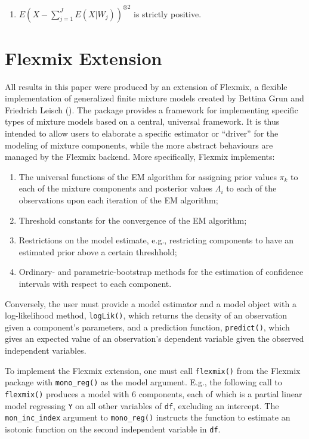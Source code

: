 \documentclass[10pt]{olplainarticle}\usepackage[]{graphicx}\usepackage[]{color}
\begin{document}
\begin{appendices}
\begin{enumerate}
  \item $E(X - \sum_{j=1}^{J}E(X|W_j))^{\otimes 2}$ is strictly positive.
\end{enumerate}

\section{Flexmix Extension}


All results in this paper were produced by an extension of Flexmix, a flexible implementation of generalized finite mixture models created by Bettina Grun and Friedrich Leisch (\cite{flexmix}). The package provides a framework for implementing specific types of mixture models based on a central, universal framework. It is thus intended to allow users to elaborate a specific estimator or ``driver'' for the modeling of mixture components, while the more abstract behaviours are managed by the Flexmix backend. More specifically, Flexmix implements:

\begin{enumerate}
  \item The universal functions of the EM algorithm for assigning prior values $\pi_k$ to each of the mixture components and posterior values $\Lambda_i$ to each of the observations upon each iteration of the EM algorithm;
  \item Threshold constants for the convergence of the EM algorithm;
  \item Restrictions on the model estimate, e.g., restricting components to have an estimated prior above a certain threshhold;
  \item Ordinary- and parametric-bootstrap methods for the estimation of confidence intervals with respect to each component.
\end{enumerate}

Conversely, the user must provide a model estimator and a model object with a log-likelihood method, \texttt{logLik()}, which returns the density of an observation given a component's parameters, and a prediction function, \texttt{predict()}, which gives an expected value of an observation's dependent variable given the observed independent variables.

To implement the Flexmix extension, one must call \texttt{flexmix()} from the Flexmix package with \texttt{mono\_reg()} as the model argument. E.g., the following call to \texttt{flexmix()} produces a model with 6 components, each of which is a partial linear model regressing \texttt{Y} on all other 
variables of \texttt{df}, excluding an intercept. The \texttt{mon\_inc\_index} argument to \texttt{mono\_reg()} instructs the function to estimate an isotonic function on the second independent variable in \texttt{df}.


\end{appendices}
\end{document}
